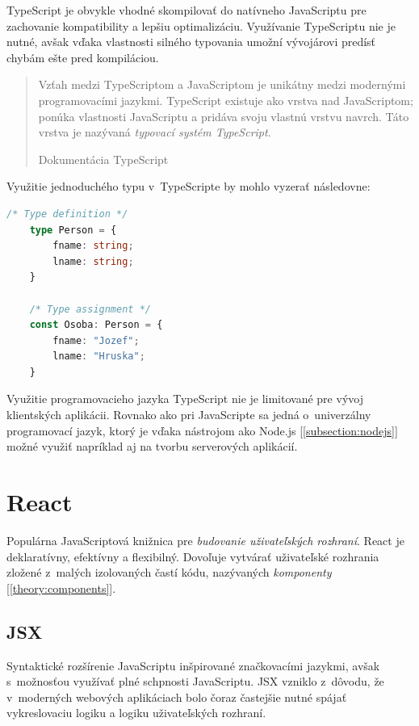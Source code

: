 TypeScript je obvykle vhodné skompilovať do natívneho JavaScriptu pre zachovanie kompatibility a lepšiu optimalizáciu. Využívanie TypeScriptu nie je nutné, avšak vďaka vlastnosti silného typovania umožní vývojárovi predísť chybám ešte pred kompiláciou.

\blockquote[Dokumentácia TypeScript \cite{TSWeb}]{Vzťah medzi TypeScriptom a JavaScriptom je unikátny medzi modernými programovacími jazykmi. TypeScript existuje ako vrstva nad JavaScriptom; ponúka vlastnosti JavaScriptu a pridáva svoju vlastnú vrstvu navrch. Táto vrstva je nazývaná \emph{typovací systém TypeScript}.}

\noindent Využitie jednoduchého typu v~TypeScripte by mohlo vyzerať následovne: \\

\begin{lstlisting}[language=TypeScript, caption=Príklad zápisu v~programovacom jazyku TypeScript.]
	/* Type definition */
	type Person = {
		fname: string;
		lname: string;
	}

	/* Type assignment */
	const Osoba: Person = {
		fname: "Jozef";
		lname: "Hruska";
	}
\end{lstlisting}

\medskip

\noindent Využitie programovacieho jazyka TypeScript nie je limitované pre vývoj klientských aplikácii. Rovnako ako pri JavaScripte sa jedná o~univerzálny programovací jazyk, ktorý je vďaka nástrojom ako Node.js [\ref{subsection:nodejs}] možné využiť napríklad aj na tvorbu serverových aplikácií.

\section{React}
\label{theory:react}
Populárna JavaScriptová knižnica pre \emph{budovanie uživateľských rozhraní}. React je deklaratívny, efektívny a flexibilný. Dovoľuje vytvárať uživateľské rozhrania zložené z~malých izolovaných častí kódu, nazývaných \emph{komponenty} [\ref{theory:components}]. \cite{React}

\subsection{JSX}
Syntaktické rozšírenie JavaScriptu inšpirované značkovacími jazykmi, avšak s~možnosťou využívať plné schpnosti JavaScriptu. JSX vzniklo z~dôvodu, že v~moderných webových aplikáciach bolo čoraz častejšie nutné spájať vykreslovaciu logiku a logiku uživateľských rozhraní. \cite{React} \\

